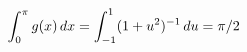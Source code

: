 \documentclass[preview]{standalone}
\begin{document}
\begin{align*}
\special{dvisvgm:raw <g id='unique000'>}\int_0^\pi g(x)\,dx=\int_{-1}^1(1+u^2)^{-1}\,du=\pi/2\special{dvisvgm:raw </g>}
\end{align*}
\end{document}
